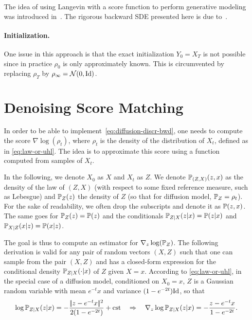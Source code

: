 The idea of using Langevin with a score function to perform generative modeling was introduced in~\cite{song2019generative}. The rigorous backward SDE presented here is due to~\cite{song2021scorebased}. 

\paragraph{Initialization.} One issue in this approach is that the exact initialization $Y_0=X_T$ is not possible since in practice $\rho_0$ is only approximately known. This is circumvented by replacing $\rho_T$ by $\rho_\infty = \mathcal{N}(0,\mathrm{Id})$.


\section{Denoising Score Matching}

In order to be able to implement~\eqref{eq:diffusion-discr-bwd}, one needs to compute the score $\nabla \log(\rho_t)$, where $\rho_t$ is the density of the distribution of $X_t$, defined as in \eqref{eq:law-or-uhl}. The idea is to approximate this score using a function computed from samples of $X_t$.

In the following, we denote $X_0$ as $X$ and $X_t$ as $Z$. 
%
We denote $\mathbb{P}_{(Z,X)}(z,x)$ as the density of the law of $(Z,X)$ (with respect to some fixed reference measure, such as Lebesgue) and $\mathbb{P}_Z(z)$ the density of $Z$ (so that for diffusion model,  $\mathbb{P}_Z=\rho_t$). 
%
For the sake of readability, we often drop the subscripts and denote it as $\mathbb{P}(z,x)$. The same goes for $\mathbb{P}_Z(z)=\mathbb{P}(z)$ and the conditionals $\mathbb{P}_{Z|X}(z|x)=\mathbb{P}(z|x)$ and $\mathbb{P}_{X|Z}(x|z)=\mathbb{P}(x|z)$. 

The goal is thus to compute an estimator for $\nabla_z \log(\mathbb{P}_Z)$.
%
The following derivation is valid for any pair of random vectors $(X,Z)$ such that one can sample from the pair $(X,Z)$ and has a closed-form expression for the conditional density $\mathbb{P}_{Z|X}(\cdot|x)$ of $Z$ given $X=x$. According to \eqref{eq:law-or-uhl}, in the special case of a diffusion model, conditioned on $X_0=x$, $Z$ is a Gaussian random variable with mean $e^{-t} x$ and variance $(1-e^{-2t}) \mathrm{Id}$, so that 
\begin{equation}
	\log \mathbb{P}_{Z|X}(z|x) =- \frac{|\!| z - e^{-t} x |\!|^2}{2 (1-e^{-2t})} + \text{cst}
	\quad \Rightarrow \quad
	\nabla_z \log \mathbb{P}_{Z|X}(z|x) = - \frac{z-e^{-t} x}{1-e^{-2t}}.
\end{equation}


